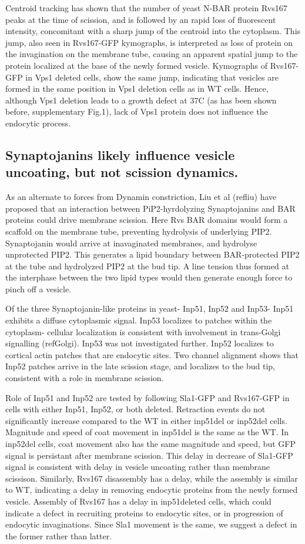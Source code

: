 \documentclass[9pt,lineno]{elife}
\begin{document}
Centroid tracking has shown that the number of yeast N-BAR protein Rvs167 peaks at the time of scission, and is followed by an rapid loss of fluorescent intensity, concomitant with a sharp jump of the centroid into the cytoplasm. This jump, also seen in Rvs167-GFP kymographs, is interpreted as loss of protein on the invagination on the membrane tube, causing an apparent spatial jump to the protein localized at the base of the newly formed vesicle. Kymographs of Rvs167-GFP in Vps1 deleted cells, show the same jump, indicating that vesicles are formed in the same position in Vps1 deletion cells as in WT cells. Hence, although Vps1 deletion leads to a growth defect at 37C (as has been shown before, supplementary Fig.1), lack of Vps1 protein does not influence the endocytic process.

\subsection{Synaptojanins likely influence vesicle uncoating, but not scission dynamics.}

As an alternate to forces from Dynamin constriction, Liu et al (refliu) have proposed that an interaction between PiP2-hyrdolyzing Synaptojanins and BAR proteins could drive membrane scission. Here Rvs BAR domains would form a scaffold on the membrane tube, preventing hydrolysis of underlying PIP2. Synaptojanin would arrive at inavaginated membranes, and hydrolyse unprotected PIP2. This generates a lipid boundary between BAR-protected PIP2 at the tube and hydrolyzed PIP2 at the bud tip. A line tension thus formed at the interphase between the two lipid types would then generate enough force to pinch off a vesicle.

Of the three Synaptojanin-like proteins in yeast- Inp51, Inp52 and Inp53- Inp51 exhibits a diffuse cytoplasmic signal. Inp53 localizes to patches within the cytoplasm- cellular localization is consistent with involvement in trans-Golgi signalling (refGolgi). Inp53 was not investigated further. Inp52 localizes to cortical actin patches that are endocytic sites. Two channel alignment shows that Inp52 patches arrive in the late scission stage, and localizes to the bud tip, consistent with a role in membrane scission. 

Role of Inp51 and Inp52 are tested by following Sla1-GFP and Rvs167-GFP in cells with either Inp51, Inp52, or both deleted. Retraction events do not significantly increase compared to the WT in either inp51del or inp52del cells. Magnitude and speed of coat movement in inp51del is the same as the WT. In inp52del cells, coat movement also has the same magnitude and speed, but GFP signal is persistant after membrane scission. This delay in decrease of Sla1-GFP signal is consistent with delay in vesicle uncoating rather than membrane scissison. Similarly, Rvs167 disassembly has a delay, while the assembly is similar to WT, indicating a delay in removing endocytic proteins from the newly formed vesicle. Assembly of Rvs167 has a delay in inp51deleted cells, which could indicate a defect in recruiting proteins to endocytic sites, or in progression of endocytic invaginations. Since Sla1 movement is the same, we suggest a defect in the former rather than latter. 
\end{document}
